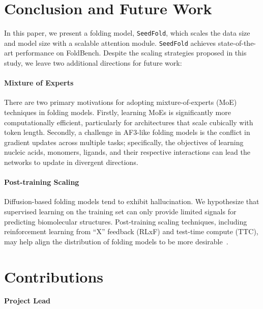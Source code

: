 \section{Conclusion and Future Work}

In this paper, we present a folding model, \texttt{SeedFold}, which scales the data size and model size with a scalable attention module. \texttt{SeedFold} achieves state-of-the-art performance on FoldBench. Despite the scaling strategies proposed in this study, we leave two additional directions for future work:



\paragraph{Mixture of Experts} There are two primary motivations for adopting mixture-of-experts (MoE) techniques in folding models. Firstly, learning MoEs is significantly more computationally efficient, particularly for architectures that scale cubically with token length. Secondly, a challenge in AF3-like folding models is the conflict in gradient updates across multiple tasks; specifically, the objectives of learning nucleic acids, monomers, ligands, and their respective interactions can lead the networks to update in divergent directions.

\paragraph{Post-training Scaling} Diffusion-based folding models tend to exhibit hallucination. We hypothesize that supervised learning on the training set can only provide limited signals for predicting biomolecular structures. Post-training scaling techniques, including reinforcement learning from ``X'' feedback (RLxF) and test-time compute (TTC), may help align the distribution of folding models to be more desirable~\cite{lai2025survey}.


\newpage

\section*{Contributions}

\textbf{Project Lead}

